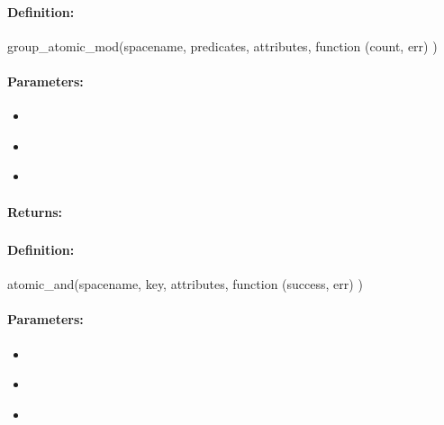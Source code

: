 \paragraph{Definition:}
\begin{javascriptcode}
group_atomic_mod(spacename, predicates, attributes, function (count, err) {})
\end{javascriptcode}
\paragraph{Parameters:}
\begin{itemize}[noitemsep]
\item {}\\

\item {}\\

\item {}\\

\end{itemize}

\paragraph{Returns:}


\pagebreak
\subsubsection{}
\label{api:nodejs:atomic_and}


\paragraph{Definition:}
\begin{javascriptcode}
atomic_and(spacename, key, attributes, function (success, err) {})
\end{javascriptcode}
\paragraph{Parameters:}
\begin{itemize}[noitemsep]
\item {}\\

\item {}\\

\item {}\\

\end{itemize}

